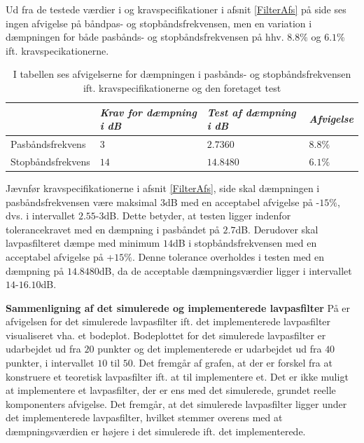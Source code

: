 \noindent Ud fra de testede værdier i  og kravspecifikationer i afsnit \ref{FilterAfs} på side \pageref{FilterAfs} ses ingen afvigelse på båndpas- og stopbåndsfrekvensen, men en variation i dæmpningen for både pasbånds- og stopbåndsfrekvensen på hhv. $8.8\%$ og $6.1$\% ift. kravspecikationerne.

\begin{table}[H]
	\centering
	\begin{tabular}{|l|l|l|l|}
		\hline
& \textit{Krav for dæmpning i dB} 	& \textit{Test af dæmpning i dB}  &\textit{Afvigelse} \\ \hline
Pasbåndsfrekvens & $3$	& $2.7360$	    & $8.8\%$ \\ \hline
Stopbåndsfrekvens & $14$    & $14.8480$    & $6.1\%$  \\ \hline
	\end{tabular}
	\caption{I tabellen ses afvigelserne for dæmpningen i pasbånds- og stopbåndsfrekvensen ift. kravspecifikationerne og den foretaget test}
	\label{Tab:Tolerance}
\end{table}

\noindent Jævnfør kravspecifikationerne i afsnit \ref{FilterAfs}, side \pageref{FilterAfs} skal dæmpningen i pasbåndsfrekvensen være maksimal $3$dB med en acceptabel afvigelse på -$15\%$, dvs. i intervallet $2.55$-$3$dB. Dette betyder, at testen ligger indenfor tolerancekravet med en dæmpning i pasbåndet på $2.7$dB. Derudover skal lavpasfilteret dæmpe med minimum $14$dB i stopbåndsfrekvensen med en acceptabel afvigelse på +$15\%$. Denne tolerance overholdes i testen med en dæmpning på $14.8480$dB, da de acceptable dæmpningsværdier ligger i intervallet $14$-$16.10$dB.

\textbf{Sammenligning af det simulerede og implementerede lavpasfilter}
På  er afvigelsen for det simulerede lavpasfilter ift. det implementerede lavpasfilter visualiseret vha. et bodeplot. Bodeplottet for det simulerede lavpasfilter er udarbejdet ud fra $20$ punkter og det implementerede er udarbejdet ud fra $40$ punkter, i intervallet $10$ til $50$. Det fremgår af grafen, at der er forskel fra at konstruere et teoretisk lavpasfilter ift. at til implementere et. Det er ikke muligt at implementere et lavpasfilter, der er ens med det simulerede, grundet reelle komponenters afvigelse. Det fremgår, at det simulerede lavpasfilter ligger under det implementerede lavpasfilter, hvilket stemmer overens med at dæmpningsværdien er højere i det simulerede ift. det implementerede. 


